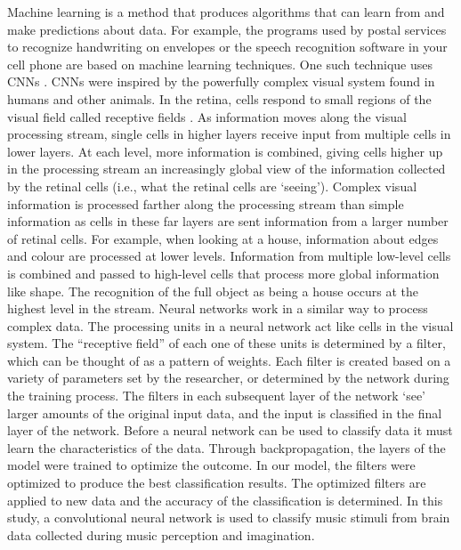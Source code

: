 Machine learning is a method that produces algorithms that can learn from and make predictions about data.
For example, the programs used by postal services to recognize handwriting on envelopes or the speech recognition software in your cell phone are based on machine learning techniques.
One such technique uses \acp{CNN} \cite{LeCun2015}.
\acp{CNN} were inspired by the powerfully complex visual system found in humans and other animals.
In the retina, cells respond to small regions of the visual field called receptive fields \cite{Kalat2008}. 
As information moves along the visual processing stream, single cells in higher layers receive input from multiple cells in lower layers.
At each level, more information is combined, giving cells higher up in the processing stream an increasingly global view of the information collected by the retinal cells (i.e., what the retinal cells are `seeing').
Complex visual information is processed farther along the processing stream than simple information as cells in these far layers are sent information from a larger number of retinal cells.
For example, when looking at a house, information about edges and colour are processed at lower levels.
Information from multiple low-level cells is combined and passed to high-level cells that process more global information like shape. 
The recognition of the full object as being a house occurs at the highest level in the stream. 
Neural networks work in a similar way to process complex data. 
The processing units in a neural network act like cells in the visual system.
The ``receptive field'' of each one of these units is determined by a filter, which can be thought of as a pattern of weights.
Each filter is created based on a variety of parameters set by the researcher, or determined by the network during the training process.
The filters in each subsequent layer of the network `see' larger amounts of the original input data, and the input is classified in the final layer of the network. 
Before a neural network can be used to classify data it must learn the characteristics of the data. 
Through backpropagation, the layers of the model were trained to optimize the outcome. 
In our model, the filters were optimized to produce the best classification results.
The optimized filters are applied to new data and the accuracy of the classification is determined. 
In this study, a convolutional neural network is used to classify music stimuli from brain data collected during music perception and imagination. 

